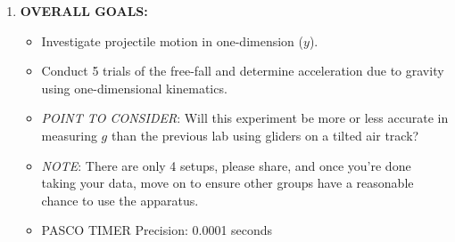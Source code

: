 \begin{enumerate}
\item \textbf{OVERALL GOALS:} 
\begin{itemize}
    \item Investigate projectile motion in one-dimension ($y$).
    \item Conduct 5 trials of the free-fall and determine acceleration due to gravity using one-dimensional kinematics.
    \item \textit{POINT TO CONSIDER}: Will this experiment be more or less accurate in measuring $g$ than the previous lab using gliders on a tilted air track?
    \item \textit{NOTE}: There are only 4 setups, please share, and once you're done taking your data, move on to ensure other groups have a reasonable chance to use the apparatus.
    \item PASCO TIMER Precision: 0.0001 seconds
\end{itemize}



\end{enumerate}

